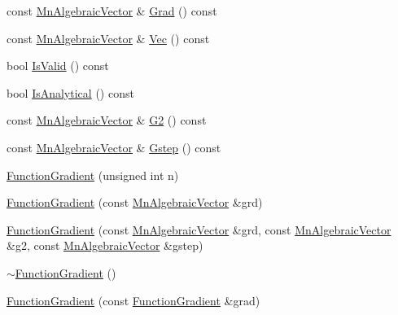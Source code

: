\begin{DoxyCompactItemize}
const \mbox{\hyperlink{namespaceROOT_1_1Minuit2_a62ed97730a1ca8d3fbaec64a19aa11c9}{Mn\+Algebraic\+Vector}} \& \mbox{\hyperlink{classROOT_1_1Minuit2_1_1FunctionGradient_a0effb8dbe0115928f72f122621ba4ad3}{Grad}} () const
\item 
const \mbox{\hyperlink{namespaceROOT_1_1Minuit2_a62ed97730a1ca8d3fbaec64a19aa11c9}{Mn\+Algebraic\+Vector}} \& \mbox{\hyperlink{classROOT_1_1Minuit2_1_1FunctionGradient_abdf0fd7d9e1a730049112f0c903a9f5f}{Vec}} () const
\item 
bool \mbox{\hyperlink{classROOT_1_1Minuit2_1_1FunctionGradient_a441801769f9021ade74b724584731791}{Is\+Valid}} () const
\item 
bool \mbox{\hyperlink{classROOT_1_1Minuit2_1_1FunctionGradient_a34dd6c6a7d699a149edfbb3328c525db}{Is\+Analytical}} () const
\item 
const \mbox{\hyperlink{namespaceROOT_1_1Minuit2_a62ed97730a1ca8d3fbaec64a19aa11c9}{Mn\+Algebraic\+Vector}} \& \mbox{\hyperlink{classROOT_1_1Minuit2_1_1FunctionGradient_a6f99988a7fd1a61ed96c6709f02b6041}{G2}} () const
\item 
const \mbox{\hyperlink{namespaceROOT_1_1Minuit2_a62ed97730a1ca8d3fbaec64a19aa11c9}{Mn\+Algebraic\+Vector}} \& \mbox{\hyperlink{classROOT_1_1Minuit2_1_1FunctionGradient_a09cf6f34997cef2cffca0d9ccc2b36b8}{Gstep}} () const
\item 
\mbox{\hyperlink{classROOT_1_1Minuit2_1_1FunctionGradient_ae2e6c3f8011dbe5aaf75c8e41b7de9b5}{Function\+Gradient}} (unsigned int n)
\item 
\mbox{\hyperlink{classROOT_1_1Minuit2_1_1FunctionGradient_afa8994fbd866150bd14ab53a2919c7bf}{Function\+Gradient}} (const \mbox{\hyperlink{namespaceROOT_1_1Minuit2_a62ed97730a1ca8d3fbaec64a19aa11c9}{Mn\+Algebraic\+Vector}} \&grd)
\item 
\mbox{\hyperlink{classROOT_1_1Minuit2_1_1FunctionGradient_ac9d34f0e3e55ec0e9d5e8a8bd3678b79}{Function\+Gradient}} (const \mbox{\hyperlink{namespaceROOT_1_1Minuit2_a62ed97730a1ca8d3fbaec64a19aa11c9}{Mn\+Algebraic\+Vector}} \&grd, const \mbox{\hyperlink{namespaceROOT_1_1Minuit2_a62ed97730a1ca8d3fbaec64a19aa11c9}{Mn\+Algebraic\+Vector}} \&g2, const \mbox{\hyperlink{namespaceROOT_1_1Minuit2_a62ed97730a1ca8d3fbaec64a19aa11c9}{Mn\+Algebraic\+Vector}} \&gstep)
\item 
\mbox{\hyperlink{classROOT_1_1Minuit2_1_1FunctionGradient_a702df78fcfb1f33625273cb1c9cb1914}{$\sim$\+Function\+Gradient}} ()
\item 
\mbox{\hyperlink{classROOT_1_1Minuit2_1_1FunctionGradient_ad21f4d36683bacc95bf2dfe74fe4d205}{Function\+Gradient}} (const \mbox{\hyperlink{classROOT_1_1Minuit2_1_1FunctionGradient}{Function\+Gradient}} \&grad)

\end{DoxyCompactItemize}
